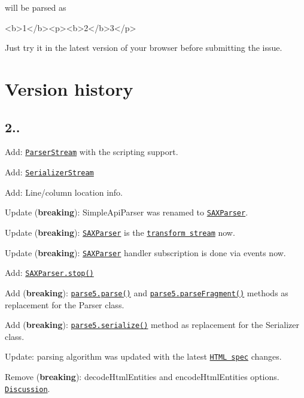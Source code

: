 will be parsed as


\begin{DoxyCode}
<b>1</b><p><b>2</b>3</p>
\end{DoxyCode}


Just try it in the latest version of your browser before submitting the issue.

\section*{Version history}

\subsection*{2..}


\begin{DoxyItemize}
\item Add\+: \href{http://inikulin.github.io/parse5/#parse5+ParserStream}{\tt Parser\+Stream} with the scripting support.
\item Add\+: \href{http://inikulin.github.io/parse5/#parse5+SerializerStream}{\tt Serializer\+Stream}
\item Add\+: Line/column location info.
\item Update ({\bfseries breaking})\+: {\ttfamily Simple\+Api\+Parser} was renamed to \href{http://inikulin.github.io/parse5/#parse5+SAXParser}{\tt S\+A\+X\+Parser}.
\item Update ({\bfseries breaking})\+: \href{http://inikulin.github.io/parse5/#parse5+SAXParser}{\tt S\+A\+X\+Parser} is the \href{https://nodejs.org/api/stream.html#stream_class_stream_transform}{\tt transform stream} now.
\item Update ({\bfseries breaking})\+: \href{http://inikulin.github.io/parse5/#parse5+SAXParser}{\tt S\+A\+X\+Parser} handler subscription is done via events now.
\item Add\+: \href{http://inikulin.github.io/parse5/#parse5+SAXParser+stop}{\tt S\+A\+X\+Parser.\+stop()}
\item Add ({\bfseries breaking})\+: \href{http://inikulin.github.io/parse5/#parse5+parse}{\tt parse5.\+parse()} and \href{http://inikulin.github.io/parse5/#parse5+parseFragment}{\tt parse5.\+parse\+Fragment()} methods as replacement for the {\ttfamily Parser} class.
\item Add ({\bfseries breaking})\+: \href{http://inikulin.github.io/parse5/#parse5+serialized}{\tt parse5.\+serialize()} method as replacement for the {\ttfamily Serializer} class.
\item Update\+: parsing algorithm was updated with the latest \href{https://html.spec.whatwg.org/}{\tt H\+T\+ML spec} changes.
\item Remove ({\bfseries breaking})\+: {\ttfamily decode\+Html\+Entities} and {\ttfamily encode\+Html\+Entities} options. \href{https://github.com/inikulin/parse5/issues/75}{\tt Discussion}.
\end{DoxyItemize}

